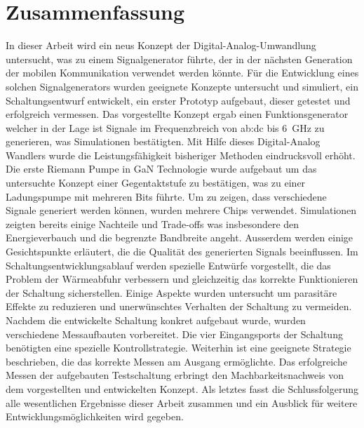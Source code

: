 \newpage
\chapter*{Zusammenfassung}

In dieser Arbeit wird ein neus Konzept der Digital-Analog-Umwandlung untersucht, was zu einem Signalgenerator f\"uhrte, der in der n\"achsten Generation der mobilen Kommunikation verwendet werden k\"onnte.
F\"ur die Entwicklung eines solchen Signalgenerators wurden geeignete Konzepte untersucht und simuliert, ein Schaltungsentwurf entwickelt, ein erster Prototyp aufgebaut, dieser getestet und erfolgreich vermessen.
Das vorgestellte Konzept ergab einen Funktionsgenerator welcher in der Lage ist Signale im Frequenzbreich von \gls{ab:dc} bis \SI{6}{\giga \hertz} zu generieren, was Simulationen best\"atigten.
Mit Hilfe dieses Digital-Analog Wandlers wurde die Leistungsf\"ahigkeit bisheriger Methoden eindrucksvoll erh\"oht.
Die erste Riemann Pumpe in GaN Technologie wurde aufgebaut um das untersuchte Konzept einer Gegentaktstufe zu best\"atigen, was zu einer Ladungspumpe mit mehreren Bits f\"uhrte.
Um zu zeigen, dass verschiedene Signale generiert werden k\"onnen, wurden mehrere Chips verwendet.
Simulationen zeigten bereits einige Nachteile und Trade-offs was insbesondere den Energieverbauch und die begrenzte Bandbreite angeht.
Ausserdem werden einige Gesichtspunkte erl\"autert, die die Qualit\"at des generierten Signals beeinflussen.
Im Schaltungsentwicklungsablauf werden spezielle Entw\"urfe vorgestellt, die das Problem der W\"armeabfuhr verbessern und gleichzeitig das korrekte Funktionieren der Schaltung sicherstellen.
Einige Aspekte wurden untersucht um parasit\"are Effekte zu reduzieren und unerw\"unschtes Verhalten der Schaltung zu vermeiden.
Nachdem die entwickelte Schaltung konkret aufgebaut wurde, wurden verschiedene Messaufbauten vorbereitet.
Die vier Eingangsports der Schaltung ben\"otigten eine spezielle Kontrollstrategie.
Weiterhin ist eine geeignete Strategie beschrieben, die das korrekte Messen am Ausgang erm\"oglichte.
Das erfolgreiche Messen der aufgebauten Testschaltung erbringt den Machbarkeitsnachweis von dem vorgestellten und entwickelten Konzept.
Als letztes fasst die Schlussfolgerung alle wesentlichen Ergebnisse dieser Arbeit zusammen und ein Ausblick f\"ur weitere Entwicklungsm\"oglichkeiten wird gegeben.
